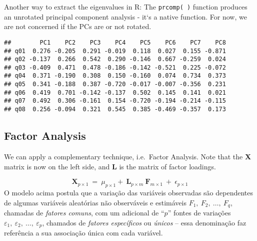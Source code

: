 \documentclass[
]{article}
\newenvironment{Shaded}{\begin{snugshade}}{\end{snugshade}}
\newcommand{\AttributeTok}[1]{\textcolor[rgb]{0.77,0.63,0.00}{#1}}
\newcommand{\CommentTok}[1]{\textcolor[rgb]{0.56,0.35,0.01}{\textit{#1}}}
\newcommand{\ConstantTok}[1]{\textcolor[rgb]{0.00,0.00,0.00}{#1}}
\newcommand{\DecValTok}[1]{\textcolor[rgb]{0.00,0.00,0.81}{#1}}
\newcommand{\FunctionTok}[1]{\textcolor[rgb]{0.00,0.00,0.00}{#1}}
\newcommand{\NormalTok}[1]{#1}
\newcommand{\OtherTok}[1]{\textcolor[rgb]{0.56,0.35,0.01}{#1}}
\newcommand{\SpecialCharTok}[1]{\textcolor[rgb]{0.00,0.00,0.00}{#1}}
\begin{document}
Another way to extract the eigenvalues in R: The \texttt{prcomp(\ )}
function produces an unrotated principal component analysis - it`s a
native function. For now, we are not concerned if the PCs are or not
rotated.

\begin{Shaded}
\end{Shaded}

\begin{verbatim}
##        PC1    PC2    PC3    PC4    PC5    PC6    PC7    PC8
## q01  0.276 -0.205  0.291 -0.019  0.118  0.027  0.155 -0.871
## q02 -0.137  0.266  0.542  0.290 -0.146  0.667 -0.259  0.024
## q03 -0.409  0.471  0.478 -0.186 -0.142 -0.521  0.225 -0.072
## q04  0.371 -0.190  0.308  0.150 -0.160  0.074  0.734  0.373
## q05  0.341 -0.188  0.387 -0.720 -0.017 -0.007 -0.356  0.231
## q06  0.419  0.701 -0.142 -0.137  0.502  0.145  0.141  0.021
## q07  0.492  0.306 -0.161  0.154 -0.720 -0.194 -0.214 -0.115
## q08  0.256 -0.094  0.321  0.545  0.385 -0.469 -0.357  0.173
\end{verbatim}

\hypertarget{factor-analysis}{%
\subsection{Factor Analysis}\label{factor-analysis}}

We can apply a complementary technique, i.e.~Factor Analysis. Note that
the \textbf{X} matrix is now on the left side, and \textbf{L} is the
matrix of factor loadings.

\[
\mathbf{X}_{p \times 1} \: = \:
\mu_{p \times 1} + \:
\mathbf {L}_{p \times m}\:\mathbf {F}_{m \times 1}\: + \:
\epsilon_{p \times 1}
\] O modelo acima postula que a variação das variáveis observadas são
dependentes de algumas variáveis aleatórias não observáveis e estimáveis
\(F_{1},\: F_{2},\: \ldots, \:F_{q}\), chamadas de
\textit{fatores comuns}, com um adicional de ``\(p\)'' fontes de
variações
\(\varepsilon_{1},\:\varepsilon_{2},\: \ldots, \:\varepsilon_{p}\),
chamados de \textit{fatores específicos} ou \textit{únicos} -- essa
denominação faz referência a sua associação única com cada variável.
\end{document}
